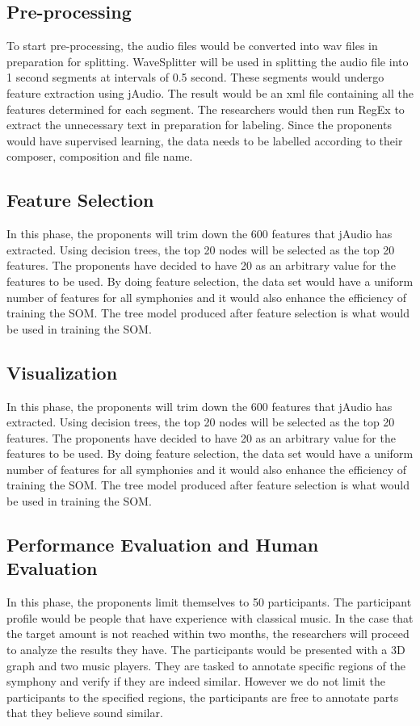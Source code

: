 \subsection{Pre-processing}
To start pre-processing,  the audio files would be converted into wav files in preparation for splitting. WaveSplitter will be used in splitting the audio file into 1 second segments at intervals of 0.5 second. These segments would undergo feature extraction using jAudio. The result would be an xml file containing all the features determined for each segment. The researchers would then run RegEx to extract the unnecessary text in preparation for labeling. Since the proponents would have supervised learning, the data needs to be labelled according to their composer, composition and file name. 

\subsection{Feature Selection}
In this phase, the proponents will trim down the 600 features that jAudio has extracted. Using decision trees, the top 20 nodes will be selected as the top 20 features. The proponents have decided to have 20 as an arbitrary value for the features to be used. By doing feature selection, the data set would have a uniform number of features for all symphonies and it would also enhance the efficiency of training the SOM. The tree model produced after feature selection is what would be used in training the SOM.

\subsection{Visualization}
In this phase, the proponents will trim down the 600 features that jAudio has extracted. Using decision trees, the top 20 nodes will be selected as the top 20 features. The proponents have decided to have 20 as an arbitrary value for the features to be used. By doing feature selection, the data set would have a uniform number of features for all symphonies and it would also enhance the efficiency of training the SOM. The tree model produced after feature selection is what would be used in training the SOM.

\subsection{Performance Evaluation and Human Evaluation}
In this phase, the proponents limit themselves to 50 participants. The participant profile would be people that have experience with classical music. In the case that the target amount is not reached within two months, the researchers will proceed to analyze the results they have. The participants would be presented with a 3D graph and two music players. They are tasked to annotate specific regions of the symphony and verify if they are indeed similar. However we do not limit the participants to the specified regions, the participants are free to annotate parts that they believe sound similar. 

